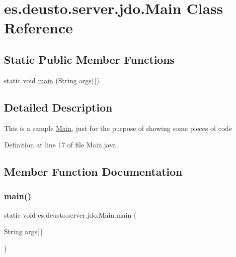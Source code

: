 \hypertarget{classes_1_1deusto_1_1server_1_1jdo_1_1_main}{}\section{es.\+deusto.\+server.\+jdo.\+Main Class Reference}
\label{classes_1_1deusto_1_1server_1_1jdo_1_1_main}
\subsection*{Static Public Member Functions}
\begin{DoxyCompactItemize}
\item 
static void \mbox{\hyperlink{classes_1_1deusto_1_1server_1_1jdo_1_1_main_ae5c4387237170481808b08438af03fd9}{main}} (String args\mbox{[}$\,$\mbox{]})
\end{DoxyCompactItemize}


\subsection{Detailed Description}
This is a sample \mbox{\hyperlink{classes_1_1deusto_1_1server_1_1jdo_1_1_main}{Main}}, just for the purpose of showing some pieces of code 

Definition at line 17 of file Main.\+java.



\subsection{Member Function Documentation}
\mbox{\label{classes_1_1deusto_1_1server_1_1jdo_1_1_main_ae5c4387237170481808b08438af03fd9}} 
\subsubsection{\texorpdfstring{main()}{main()}}
{\footnotesize\ttfamily static void es.\+deusto.\+server.\+jdo.\+Main.\+main (\begin{DoxyParamCaption}\item[{String}]{args\mbox{[}$\,$\mbox{]} }\end{DoxyParamCaption})\hspace{0.3cm}{\ttfamily [static]}}



